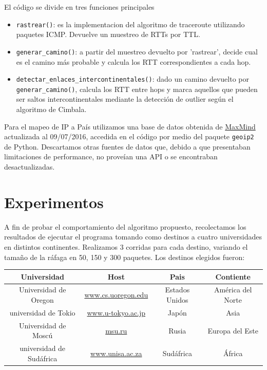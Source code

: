 El código se divide en tres funciones principales
\begin{itemize}
	\item{\texttt{rastrear()}: es la implementacion del algoritmo de traceroute utilizando paquetes ICMP. Devuelve un muestreo de RTTs por TTL.}
	\item{\texttt{generar\_camino()}: a partir del muestreo devuelto por 'rastrear', decide cual es el camino más probable y calcula los RTT correspondientes a cada hop.}
	\item{\texttt{detectar\_enlaces\_intercontinentales()}: dado un camino devuelto por \texttt{generar\_camino()}, calcula los RTT entre hops y marca aquellos que pueden ser saltos intercontinentales mediante la detección de outlier según el algoritmo de Cimbala.}
\end{itemize}	

Para el mapeo de IP a País utilizamos una base de datos obtenida de \href{http://www.maxmind.com}{MaxMind} actualizada al 09/07/2016, accedida en el código por medio del paquete \texttt{geoip2} de Python. Descartamos otras fuentes de datos que, debido a que presentaban limitaciones de performance, no proveían una API o se encontraban desactualizadas. 


\section{Experimentos}
A fin de probar el comportamiento del algoritmo propuesto, recolectamos los resultados de ejecutar el programa tomando como destinos a cuatro universidades en distintos continentes. Realizamos 3 corridas para cada destino, variando el tamaño de la ráfaga en 50, 150 y 300 paquetes.
Los destinos elegidos fueron:

\begin{center}
   \begin{tabular}{ | c | c | c | c | }
     \hline
     \textbf{Universidad} & \textbf{Host} & \textbf{Pais} & \textbf{Contiente} \\ \hline
     Universidad de Oregon & \url{www.cs.uoregon.edu} & Estados Unidos & América del Norte\\ \hline
     universidad de Tokio & \url{www.u-tokyo.ac.jp} & Japón & Asia\\ \hline
     Universidad de Moscú & \url{msu.ru} & Rusia & Europa del Este\\ \hline
     universidad de Sudáfrica & \url{www.unisa.ac.za} & Sudáfrica & África \\ \hline
   \end{tabular}
 \end{center}
 
